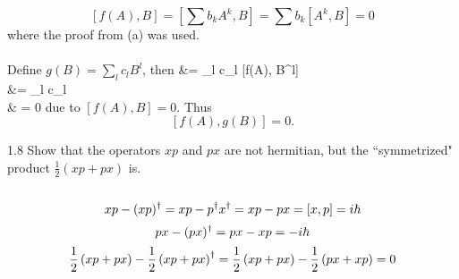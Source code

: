 \documentclass[10pt,letterpaper]{article}
\begin{document}
	\item
	\[
		[f(A),B] = [\sum b_k A^k, B] = \sum b_k[A^k,B] = 0
	\]
	where the proof from (a) was used. 
	\\ \\
	Define $g(B) = \sum_l c_l B^l$, then
	\ba
		[f(A),g(B)] &= \sum_{l} c_l [f(A), B^l] \\
		&= \sum_l c_l  \\
		& = 0
	\ea
	due to $[f(A),B]=0$. Thus
	\[
		[f(A),g(B)] = 0.
	\]
	\eenum
	
	\item[1.8]
	Show that the operators $xp$ and $px$ are not hermitian, but the ``symmetrized" product 
	$ \frac{1}{2}(xp+px)$ is.
	\\ \\
	\[
		xp-(xp)^{\dag} = xp-p^\dag x^\dag = xp-px = [x,p] = i\hbar
	\]
	\[
		px-(px)^\dag = px-xp = -i\hbar
	\]
	\[
		\frac{1}{2}\left( xp+px\right)- \frac{1}{2}\left( xp+px\right)^\dag = \frac{1}{2}\left( xp+px\right) - \frac{1}{2}\left( px+xp\right) = 0 
	\]
	\eenum
\end{document}
